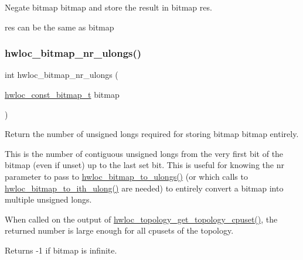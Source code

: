 Negate bitmap {\ttfamily bitmap} and store the result in bitmap {\ttfamily res}. 

{\ttfamily res} can be the same as {\ttfamily bitmap} \mbox{\label{a00205_gac0744734d761d65c977aece565364908}} 
\subsubsection{\texorpdfstring{hwloc\+\_\+bitmap\+\_\+nr\+\_\+ulongs()}{hwloc\_bitmap\_nr\_ulongs()}}
{\footnotesize\ttfamily int hwloc\+\_\+bitmap\+\_\+nr\+\_\+ulongs (\begin{DoxyParamCaption}\item[{\hyperlink{a00205_gae991a108af01d408be2776c5b2c467b2}{hwloc\+\_\+const\+\_\+bitmap\+\_\+t}}]{bitmap }\end{DoxyParamCaption})}



Return the number of unsigned longs required for storing bitmap {\ttfamily bitmap} entirely. 

This is the number of contiguous unsigned longs from the very first bit of the bitmap (even if unset) up to the last set bit. This is useful for knowing the {\ttfamily nr} parameter to pass to \hyperlink{a00205_gacd215a2348732de25d94a4ecd76d528c}{hwloc\+\_\+bitmap\+\_\+to\+\_\+ulongs()} (or which calls to \hyperlink{a00205_gac92e6404f648d6b99d2c626b05b2ffa4}{hwloc\+\_\+bitmap\+\_\+to\+\_\+ith\+\_\+ulong()} are needed) to entirely convert a bitmap into multiple unsigned longs.

When called on the output of \hyperlink{a00202_ga79212faa07b70dd26588941b17d9fa82}{hwloc\+\_\+topology\+\_\+get\+\_\+topology\+\_\+cpuset()}, the returned number is large enough for all cpusets of the topology.

\begin{DoxyReturn}{Returns}
-\/1 if {\ttfamily bitmap} is infinite. 
\end{DoxyReturn}
\mbox{\label{a00205_ga10be0840cdeb7ce26d862819dd303baa}} 
